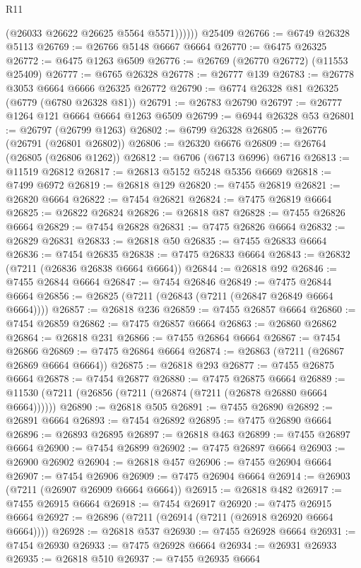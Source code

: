 \begin{lexlean}{R11}
\begin{coremodule}
{{{{{{{{{{{{{{{{{{{{{{{{{{{{{{{{{{{{{{{{{{{{{{{{{{{{{{{{{{{{{{{{{{{{{{{{{{{{{{{{{{              (@26033 @26622 @26625 @5564 @5571))))))
    @25409
@26766 := @6749 @26328 @5113
@26769 := @26766 @5148 @6667 @6664
@26770 := @6475 @26325
@26772 := @6475 @1263 @6509
@26776 := @26769 (@26770 @26772) (@11553 @25409)
@26777 := @6765 @26328
@26778 := @26777 @139
@26783 := @26778 @3053 @6664 @6666 @26325 @26772
@26790 := @6774 @26328 @81 @26325 (@6779 (@6780 @26328 @81))
@26791 := @26783 @26790
@26797 := @26777 @1264 @121 @6664 @6664 @1263 @6509
@26799 := @6944 @26328 @53
@26801 := @26797 (@26799 @1263)
@26802 := @6799 @26328
@26805 := @26776 (@26791 (@26801 @26802))
@26806 := @26320 @6676
@26809 := @26764 (@26805 (@26806 @1262))
@26812 := @6706 (@6713 @6996) @6716
@26813 := @11519 @26812
@26817 := @26813 @5152 @5248 @5356 @6669
@26818 := @7499 @6972
@26819 := @26818 @129
@26820 := @7455 @26819
@26821 := @26820 @6664
@26822 := @7454 @26821
@26824 := @7475 @26819 @6664
@26825 := @26822 @26824
@26826 := @26818 @87
@26828 := @7455 @26826 @6664
@26829 := @7454 @26828
@26831 := @7475 @26826 @6664
@26832 := @26829 @26831
@26833 := @26818 @50
@26835 := @7455 @26833 @6664
@26836 := @7454 @26835
@26838 := @7475 @26833 @6664
@26843 := @26832 (@7211 (@26836 @26838 @6664 @6664))
@26844 := @26818 @92
@26846 := @7455 @26844 @6664
@26847 := @7454 @26846
@26849 := @7475 @26844 @6664
@26856 := @26825 (@7211 (@26843 (@7211 (@26847 @26849 @6664 @6664))))
@26857 := @26818 @236
@26859 := @7455 @26857 @6664
@26860 := @7454 @26859
@26862 := @7475 @26857 @6664
@26863 := @26860 @26862
@26864 := @26818 @231
@26866 := @7455 @26864 @6664
@26867 := @7454 @26866
@26869 := @7475 @26864 @6664
@26874 := @26863 (@7211 (@26867 @26869 @6664 @6664))
@26875 := @26818 @293
@26877 := @7455 @26875 @6664
@26878 := @7454 @26877
@26880 := @7475 @26875 @6664
@26889 := @11530 (@7211 (@26856 (@7211 (@26874 (@7211 (@26878 @26880 @6664 @6664))))))
@26890 := @26818 @505
@26891 := @7455 @26890
@26892 := @26891 @6664
@26893 := @7454 @26892
@26895 := @7475 @26890 @6664
@26896 := @26893 @26895
@26897 := @26818 @463
@26899 := @7455 @26897 @6664
@26900 := @7454 @26899
@26902 := @7475 @26897 @6664
@26903 := @26900 @26902
@26904 := @26818 @457
@26906 := @7455 @26904 @6664
@26907 := @7454 @26906
@26909 := @7475 @26904 @6664
@26914 := @26903 (@7211 (@26907 @26909 @6664 @6664))
@26915 := @26818 @482
@26917 := @7455 @26915 @6664
@26918 := @7454 @26917
@26920 := @7475 @26915 @6664
@26927 := @26896 (@7211 (@26914 (@7211 (@26918 @26920 @6664 @6664))))
@26928 := @26818 @537
@26930 := @7455 @26928 @6664
@26931 := @7454 @26930
@26933 := @7475 @26928 @6664
@26934 := @26931 @26933
@26935 := @26818 @510
@26937 := @7455 @26935 @6664
}}}}}}}}}}}}}}}}}}}}}}}}}}}}}}}}}}}}}}}}}}}}}}}}}}}}}}}}}}}}}}}}}}}}}}}}}}}}}}}}}}
\end{coremodule}
\end{lexlean}
